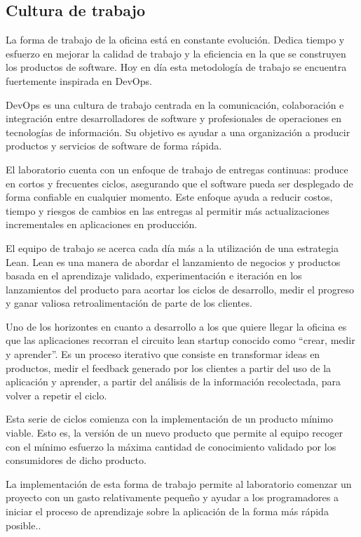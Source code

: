 \subsection{Cultura de trabajo}
\label{cultura_de_trabajo}

La forma de trabajo de la oficina está en constante evolución. Dedica tiempo y
esfuerzo en mejorar la calidad de trabajo y la eficiencia en la que se
construyen los productos de software. Hoy en día esta metodología de trabajo se
encuentra fuertemente inspirada en DevOps.

DevOps es una cultura de trabajo centrada en la comunicación, colaboración e
integración entre desarrolladores de software y profesionales de operaciones en
tecnologías de información. Su objetivo es ayudar a una organización a producir
productos y servicios de software de forma rápida.

El laboratorio cuenta con un enfoque de trabajo de entregas continuas: produce
en cortos y frecuentes ciclos, asegurando que el software pueda ser desplegado
de forma confiable en cualquier momento. Este enfoque ayuda a reducir costos,
tiempo y riesgos de cambios en las entregas al permitir más actualizaciones
incrementales en aplicaciones en producción.

El equipo de trabajo se acerca cada día más a la utilización de una estrategia
Lean. Lean es una manera de abordar el lanzamiento de negocios y productos
basada en el aprendizaje validado, experimentación e iteración en los
lanzamientos del producto para acortar los ciclos de desarrollo, medir el
progreso y ganar valiosa retroalimentación de parte de los clientes.

Uno de los horizontes en cuanto a desarrollo a los que quiere llegar la oficina
es que las aplicaciones recorran el circuito lean startup conocido como “crear,
medir y aprender”. Es un proceso iterativo que consiste en transformar ideas en
productos, medir el feedback generado por los clientes a partir del uso de la
aplicación y aprender, a partir del análisis de la información recolectada,
para volver a repetir el ciclo.

Esta serie de ciclos comienza con la implementación de un producto mínimo
viable. Esto es, la versión de un nuevo producto que permite al equipo recoger
con el mínimo esfuerzo la máxima cantidad de conocimiento validado por los
consumidores de dicho producto.

La implementación de esta forma de trabajo permite al laboratorio comenzar un
proyecto con un gasto relativamente pequeño y ayudar a los programadores a
iniciar el proceso de aprendizaje sobre la aplicación de la forma más rápida
posible.\cite[p~.2]{lean:the_lean_startup}.

